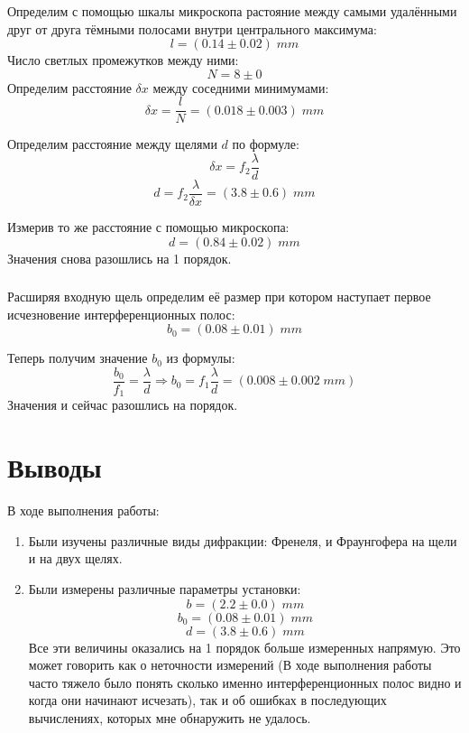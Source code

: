 \documentclass{article}
\begin{document}
\subsubsection{}
Определим с помощью шкалы микроскопа растояние между самыми удалёнными друг от друга тёмными полосами
внутри центрального максимума:
\[ l = (0.14 \pm 0.02)\;mm \]
Число светлых промежутков между ними:
\[ N = 8\pm 0 \]
Определим расстояние \(\delta x\) между соседними минимумами:
\[ \delta x = \frac{l}{N} = (0.018\pm 0.003)\; mm \]

Определим расстояние между щелями \(d\) по формуле:
\[ \delta x = f_2\frac{\lambda}{d} \]
\[ d = f_2\frac{\lambda}{\delta x} = (3.8\pm 0.6)\;mm \]

Измерив то же расстояние с помощью микроскопа:
\[ d = (0.84\pm 0.02)\;mm \]
Значения снова разошлись на 1 порядок.

\subsubsection{}
Расширяя входную щель определим её размер при котором наступает первое исчезновение интерференционных полос:
\[ b_0 = (0.08\pm 0.01)\;mm \]

Теперь получим значение \(b_0\) из формулы:
\[ \frac{b_0}{f_1} = \frac{\lambda}{d} \Rightarrow b_0 = f_1\frac{\lambda}{d} = (0.008 \pm 0.002\;mm)\]
Значения и сейчас разошлись на порядок.

\section{Выводы}
В ходе выполнения работы:
\begin{enumerate}
  \item Были изучены различные виды дифракции: Френеля, и Фраунгофера на щели и на двух щелях.
  \item Были измерены различные параметры установки:
  \[ b = (2.2 \pm 0.0)\;mm \]
  \[ b_0 = (0.08\pm 0.01)\;mm \]
  \[ d = (3.8\pm 0.6)\;mm \]
  Все эти величины оказались на 1 порядок больше измеренных напрямую. Это может говорить как о неточности измерений
  (В ходе выполнения работы часто тяжело было понять сколько именно интерференционных полос видно и когда они 
  начинают исчезать), так и об ошибках в последующих вычислениях, которых мне обнаружить не удалось.
\end{enumerate}
\end{document}
